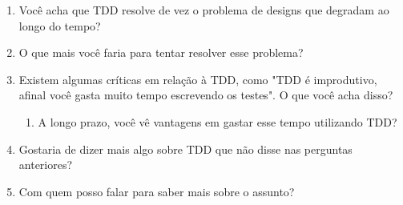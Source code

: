 \begin{enumerate}
	\item Você acha que TDD resolve de vez o problema de designs que degradam ao longo do tempo?
	\item O que mais você faria para tentar resolver esse problema?
	\item Existem algumas críticas em relação à TDD, como "TDD é improdutivo, afinal você gasta muito tempo escrevendo os testes". O que você acha disso?
		\begin{enumerate}
			\item A longo prazo, você vê vantagens em gastar esse tempo utilizando TDD?
		\end{enumerate}
	\item Gostaria de dizer mais algo sobre TDD que não disse nas perguntas anteriores?
	\item Com quem posso falar para saber mais sobre o assunto?
\end{enumerate}